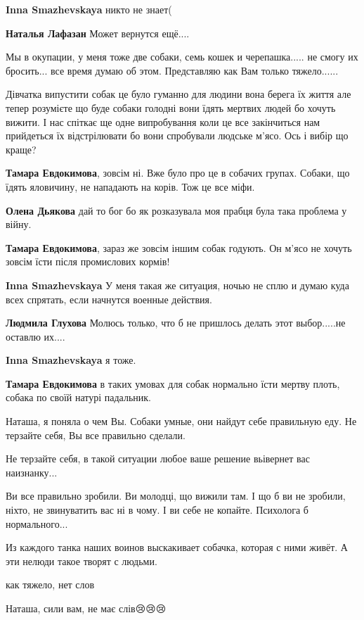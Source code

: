 \begin{itemize} %
\textbf{Inna Smazhevskaya} никто не знает(

\textbf{Наталья Лафазан} Может вернутся ещё....


Мы в окупации, у меня тоже две собаки, семь кошек и черепашка..... не смогу их
бросить... все время думаю об этом. Представляю как Вам только тяжело......


Дівчатка випустити собак це було гуманно для людини вона берега їх життя але
тепер розумієте що буде собаки голодні вони їдять мертвих людей бо хочуть
вижити. І нас спіткає ще одне випробування коли це все закінчиться нам
прийдеться їх відстрілювати бо вони спробували людське м'ясо. Ось і вибір що
краще?

\textbf{Тамара Евдокимова}, зовсім ні. Вже було про це в собачих групах. Собаки, що їдять яловичину, не нападають на корів. Тож це все міфи.

\textbf{Олена Дьякова} дай то бог бо як розказувала моя прабця була така проблема у війну.

\textbf{Тамара Евдокимова}, зараз же зовсім іншим собак годують. Он м'ясо не хочуть зовсім їсти після промислових кормів!

\textbf{Inna Smazhevskaya} У меня такая же ситуация, ночью не сплю и думаю куда всех спрятать, если начнутся военные действия.

\textbf{Людмила Глухова} Молюсь только, что б не пришлось делать этот выбор.....не оставлю их....

\textbf{Inna Smazhevskaya} я тоже.

\textbf{Тамара Евдокимова} в таких умовах для собак нормально їсти мертву плоть, собака по своїй натурі падальник.
\end{itemize} %


Наташа, я поняла о чем Вы. Собаки умные, они найдут себе правильную еду. Не терзайте себя, Вы все правильно сделали.


Не терзайте себя, в такой ситуации любое ваше решение вьівернет вас наизнанку...


Ви все правильно зробили. Ви молодці, що вижили там. І що б ви не зробили,
ніхто, не звинуватить вас ні в чому. І ви себе не копайте. Психолога б
нормального...


Из каждого танка наших воинов выскакивает собачка, которая с ними живёт. А эти
нелюди такое творят с людьми.


как тяжело, нет слов


Наташа, сили вам, не має слів😢😢😢
